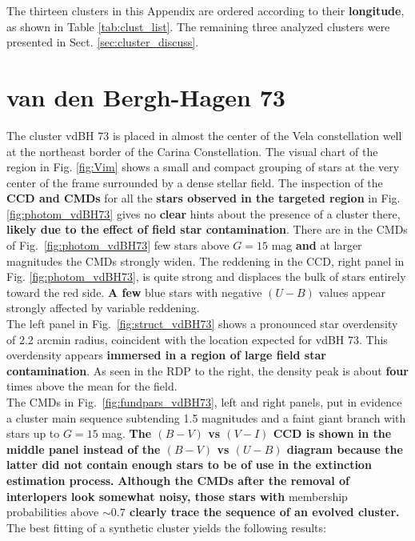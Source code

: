 \documentclass[referee]{aa}
\begin{document}
\appendix

The thirteen clusters in this Appendix are ordered according to their
\textbf{longitude}, as shown in Table \ref{tab:clust_list}. The remaining three
analyzed clusters were presented in Sect. \ref{sec:cluster_discuss}.


\section{van den Bergh-Hagen 73}

The cluster vdBH 73 is placed in almost the center of the Vela
constellation well at the northeast border of the Carina Constellation. The
visual chart of the region in Fig. \ref{fig:Vim} shows a small and compact
grouping of stars at the very center of the frame surrounded by a dense stellar
field.
The inspection of the \textbf{CCD and CMDs} for all the \textbf{stars observed
in the targeted region} in Fig. \ref{fig:photom_vdBH73} gives no \textbf{clear}
hints about the presence of a cluster there, \textbf{likely due to the
effect of field star contamination}.
There are in the CMDs of Fig.~\ref{fig:photom_vdBH73} few stars above $G=15$
mag \textbf{and} at larger magnitudes the CMDs strongly widen.
The reddening in the CCD, right panel in Fig. \ref{fig:photom_vdBH73}, is quite
strong and displaces the bulk of stars entirely toward the red side. \textbf{A
few} blue stars with negative $(U-B)$ values appear strongly affected by
variable reddening.\\

The left panel in Fig.~\ref{fig:struct_vdBH73} shows a pronounced star
overdensity of 2.2 arcmin radius, coincident with the location expected for
vdBH 73. This overdensity appears \textbf{immersed in a region of large field
star contamination}. As seen in the RDP to the right, the density peak is about
\textbf{four} times above the mean for the field.\\

The CMDs in Fig.~\ref{fig:fundpars_vdBH73}, left and right panels, put in
evidence a cluster main sequence subtending 1.5 magnitudes and a faint giant
branch with stars up to $G=15$ mag.
\textbf{The $(B-V)$ vs $(V-I)$ CCD is shown in the middle panel instead of the
$(B-V)$ vs $(U-B)$ diagram because the latter did not contain enough stars to
be of use in the extinction estimation process.}
\textbf{Although the CMDs after the removal of interlopers look somewhat noisy,
those stars with} membership probabilities above \textbf{$\sim0.7$ clearly
trace the sequence of an evolved cluster.}
%
The best fitting of a synthetic cluster yields the following results:
\end{document}
